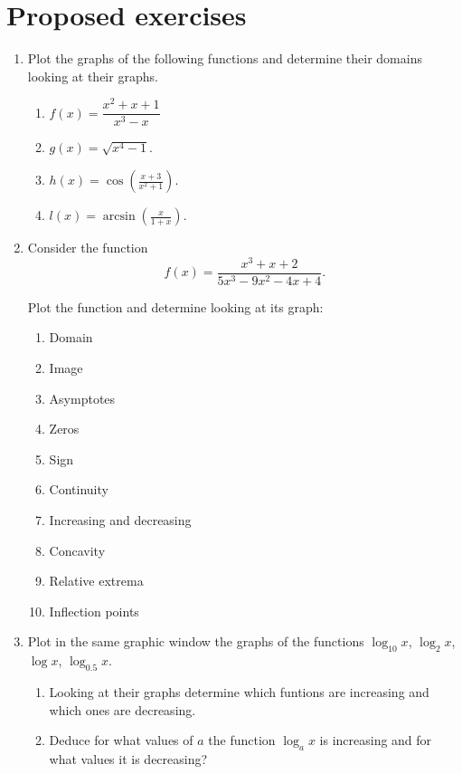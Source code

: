 \section{Proposed exercises}
\begin{enumerate}[leftmargin=*]
\item Plot the graphs of the following functions and determine their domains looking at their graphs.

      \begin{enumerate}
      \item $f(x)=\dfrac{x^2+x+1}{x^3-x}$
      \item $g(x)=\sqrt{x^4-1}$.
      \item $h(x)=\cos\left(\frac{x+3}{x^2+1}\right)$.
      \item $l(x)=\arcsin\left(\frac{x}{1+x}\right)$.
      \end{enumerate}

\item Consider the function
      \[
      f(x)=\frac{x^3+x+2}{5x^3-9x^2-4x+4}.
      \]

      Plot the function and determine looking at its graph:
      \begin{enumerate}
      \item Domain
      \item Image
      \item Asymptotes
      \item Zeros
      \item Sign
      \item Continuity
      \item Increasing and decreasing
      \item Concavity
      \item Relative extrema
      \item Inflection points
      \end{enumerate}

\item Plot in the same graphic window the graphs of the functions $\log_{10}x$, $\log_{2}x$, $\log x$, $\log_{0.5}x$.
      \begin{enumerate}
      \item Looking at their graphs determine which funtions are increasing and which ones are decreasing.
      \item Deduce for what values of $a$ the function $\log_ax$ is increasing and for what values it is decreasing?
      \end{enumerate}


\end{enumerate}
